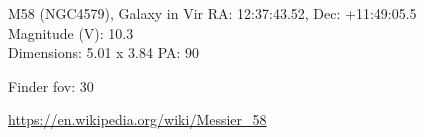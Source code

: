 \begin{block}{M58 (NGC4579), Galaxy in Vir}
    RA: 12:37:43.52, Dec: +11:49:05.5 \\ 
    Magnitude (V): 10.3 \\ 
    Dimensions: 5.01 x 3.84 PA: 90 

    Finder fov: 30 

    \url{https://en.wikipedia.org/wiki/Messier_58} 
\end{block}
